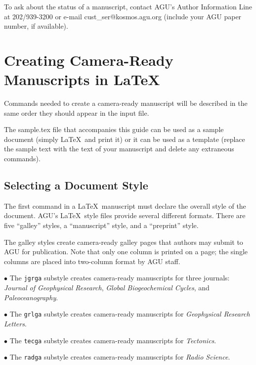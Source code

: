 \begin{article}
To ask about the status of a manuscript, contact 
AGU's Author Information Line at 202/939-3200 
or e-mail cust\_ser@kosmos.agu.org (include your 
AGU paper number, if available).


\section{Creating Camera-Ready Manuscripts in \LaTeX}

Commands needed to create a camera-ready manuscript will 
be described in the same order they should appear in the 
input file.

The sample.tex file that accompanies this guide can be 
used as a sample document (simply \LaTeX\ and print it) 
or it can be used as a template (replace the sample text 
with the text of your manuscript and delete any extraneous
commands).


\subsection{Selecting a Document Style}

The first command in a \LaTeX\ manuscript must declare 
the overall style of the document.  AGU's \LaTeX\ 
style files provide several different formats.  There are 
five ``galley'' styles, a ``manuscript'' style, and a 
``preprint'' style.

The galley styles create camera-ready galley pages that 
authors may submit to AGU for publication.  Note that 
only one column is printed on a page; the single columns 
are placed into two-column format by AGU staff.
\vspace{10pt}

$\bullet$ The {\tt jgrga} substyle creates camera-ready 
          manuscripts for three journals:  {\it Journal of 
       Geophysical Research}, {\it Global Biogeochemical 
      Cycles}, and {\it Paleoceanography}.
\vspace{10pt}

$\bullet$ The {\tt grlga} substyle creates camera-ready 
       manuscripts for {\it Geophysical Research Letters}.
\vspace{10pt}

$\bullet$ The {\tt tecga} substyle creates camera-ready 
        manuscripts for {\it Tectonics}.
\vspace{10pt}

$\bullet$ The {\tt radga} substyle creates camera-ready 
   manuscripts for {\it Radio Science}.
\vspace{10pt}


\end{article}
